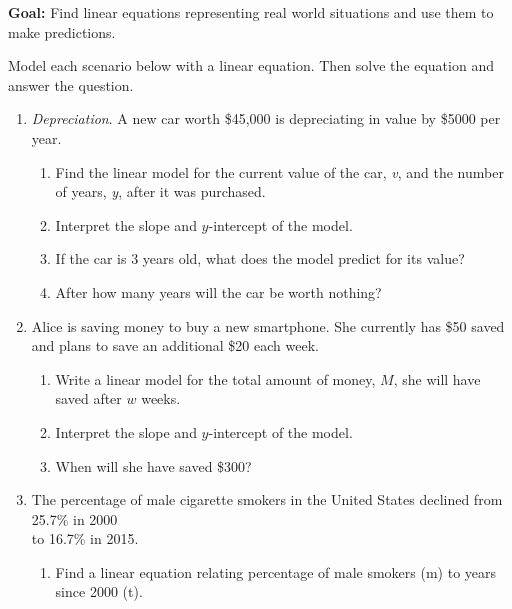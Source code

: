 \documentclass[12pt, twoside]{report}
\begin{document}



\textbf{Goal:} Find linear equations representing real world situations and use them to make predictions.


Model each scenario below with a linear equation.  Then solve the equation and answer the question.

\begin{enumerate}

	\item
	  \emph{Depreciation}. A new car worth \$45,000 is depreciating in value by \$5000 per year.
  
		\begin{enumerate}
	  		\item Find the linear model for the current value of the car, \emph{v}, and the number of years, \emph{y}, after it was purchased.
	  		
	  		\item Interpret the slope and $y$-intercept of the model.
	
	  	
	  		\item If the car is 3 years old, what does the model predict for its value?
	
	
			\item After how many years will the car be worth nothing?
	
	  	\end{enumerate}
 \vfill 
  
  



\pagebreak



	\item Alice is saving money to buy a new smartphone. She currently has \$50 saved and plans to save an additional \$20 each week.
		\begin{enumerate}
			\item Write a linear model for the total amount of money, $M$, she will have saved after $w$ weeks.


			\item Interpret the slope and $y$-intercept of the model.

	
			\item When will she have saved \$300?

		\end{enumerate}
 \vfill


\pagebreak

	\item The percentage of male cigarette smokers in the United States declined from 25.7\% in 2000 \\
	to 16.7\% in 2015. 
		\begin{enumerate}
			\item Find a linear equation relating percentage of male smokers (m) to years since 2000 (t).
			\vfill



\end{enumerate}
\end{enumerate}
\end{document}
